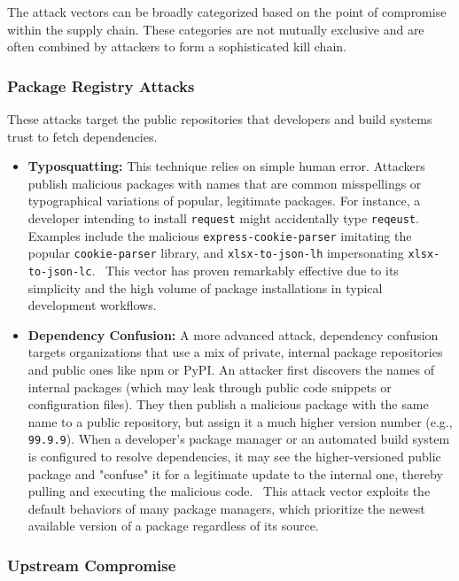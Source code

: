 \documentclass{article}
\begin{document}
The attack vectors can be broadly categorized based on the point of compromise within the supply chain. These categories are not mutually exclusive and are often combined by attackers to form a sophisticated kill chain.

\subsubsection{Package Registry Attacks}

These attacks target the public repositories that developers and build systems trust to fetch dependencies.

\begin{itemize}
\item \textbf{Typosquatting:} This technique relies on simple human error. Attackers publish malicious packages with names that are common misspellings or typographical variations of popular, legitimate packages. For instance, a developer intending to install \lstinline{request} might accidentally type \lstinline{reqeust}. Examples include the malicious \lstinline{express-cookie-parser} imitating the popular \lstinline{cookie-parser} library, and \lstinline{xlsx-to-json-lh} impersonating \lstinline{xlsx-to-json-lc}.~\cite{ohm2020backstabber} This vector has proven remarkably effective due to its simplicity and the high volume of package installations in typical development workflows.~\cite{zimmermann2019small}
\item \textbf{Dependency Confusion:} A more advanced attack, dependency confusion targets organizations that use a mix of private, internal package repositories and public ones like npm or PyPI. An attacker first discovers the names of internal packages (which may leak through public code snippets or configuration files). They then publish a malicious package with the same name to a public repository, but assign it a much higher version number (e.g., \lstinline{99.9.9}). When a developer's package manager or an automated build system is configured to resolve dependencies, it may see the higher-versioned public package and "confuse" it for a legitimate update to the internal one, thereby pulling and executing the malicious code.~\cite{ohm2020backstabber} This attack vector exploits the default behaviors of many package managers, which prioritize the newest available version of a package regardless of its source.~\cite{ohm2020backstabber}
\end{itemize}

\subsubsection{Upstream Compromise}
\end{document}
